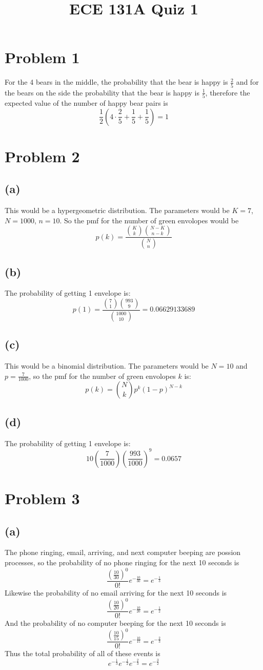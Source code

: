 
\title{ECE 131A Quiz 1}

\maketitle
\section*{Problem 1}
For the 4 bears in the middle, the probability that the bear is happy is 
$\frac{2}{5}$ and for the bears on the side the probability that the bear is happy is
$\frac{1}{5}$, therefore the expected value of the number of happy bear pairs is
$$\frac{1}{2}(4\cdot\frac{2}{5}+\frac{1}{5}+\frac{1}{5})=\boxed{1}$$
\section*{Problem 2}
\subsection*{(a)}
This would be a hypergeometric distribution. The parameters would be
$K=7$, $N=1000$, $n=10$. So the pmf for the number of green envolopes
would be
$$p(k)=\frac{\binom{K}{k}\binom{N-K}{n-k}}{\binom{N}{n}}$$
\subsection*{(b)}
The probability of getting 1 envelope is:
$$p(1)=\frac{\binom{7}{1}\binom{993}{9}}{\binom{1000}{10}}=0.06629133689$$
\subsection*{(c)}
This would be a binomial distribution. The parameters would be
$N=10$ and $p=\frac{7}{1000}$, so the pmf for the number of green envolopes $k$ 
is:
$$p(k)=\binom{N}{k}p^k(1-p)^{N-k}$$
\subsection*{(d)}
The probability of getting 1 envelope is:
$$10\left(\frac{7}{1000}\right)\left(\frac{993}{1000}\right)^9=\boxed{0.0657}$$
\section*{Problem 3}
\subsection*{(a)}
The phone ringing, email, arriving, and next computer beeping are 
possion processes, so the probability of no phone ringing for the next 10 seconds
is 
$$\frac{(\frac{10}{30})^0}{0!}e^{-\frac{10}{30}} = e^{-\frac{1}{3}}$$
Likewise the probability of no email arriving for the next 10 seconds is
$$\frac{(\frac{10}{20})^0}{0!}e^{-\frac{10}{20}} = e^{-\frac{1}{2}}$$
And the probability of no computer beeping for the next 10 seconds is
$$\frac{(\frac{10}{15})^0}{0!}e^{-\frac{10}{15}} = e^{-\frac{2}{3}}$$
Thus the total probability of all of these events is 
$$e^{-\frac{1}{3}}e^{-\frac{1}{2}}e^{-\frac{2}{3}} = \boxed{e^{-\frac{3}{2}}}$$
